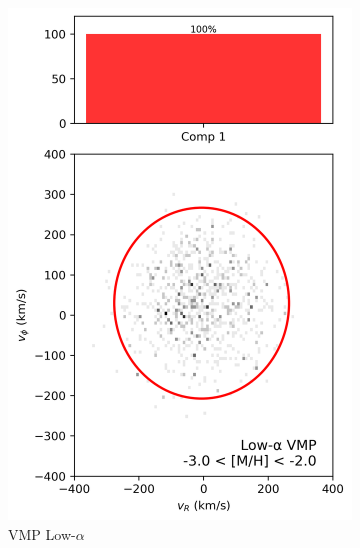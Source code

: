 \documentclass[a4paper,10pt]{article}
\begin{document}
\begin{multicols}{2}
\begin{figure}[H]
  \begin{subfigure}[t]{0.24\linewidth}
    \includegraphics[width=\linewidth]{../figures/gmm_vmp_low_alpha_k1.png}
    \caption{VMP Low-$\alpha$}
  \end{subfigure}
  \hfill
  \begin{subfigure}[t]{0.24\linewidth}

\end{subfigure}
\end{figure}
\end{multicols}
\end{document}
